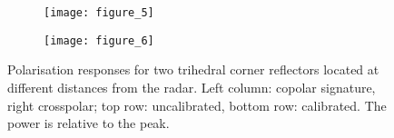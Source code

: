 \begin{figure}[hb]
	\begin{subfigure}[t]{\columnwidth}
	\centering
	\texttt{[image: figure\_5]}
	\end{subfigure}
	\begin{subfigure}[t]{\columnwidth}
	\centering
	\texttt{[image: figure\_6]}
	\end{subfigure}
	\caption{Polarisation responses for two trihedral corner reflectors located at different distances from the radar. Left column: copolar signature, right crosspolar; top row: uncalibrated, bottom row: calibrated. The power is relative to the peak.}
\end{figure}


%
